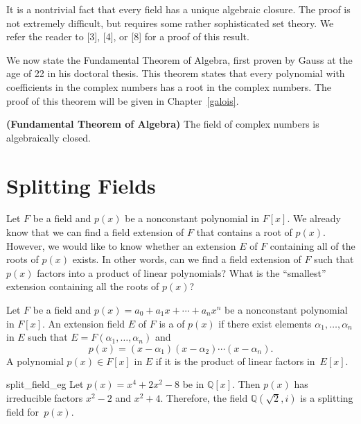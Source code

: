 It is a nontrivial fact that every field has a unique algebraic
closure. The proof is not extremely difficult, but requires some rather
sophisticated set theory. We refer the reader to [3], [4], or [8] for
a proof of this result.   %


We now state the  Fundamental Theorem of Algebra, first proven by
Gauss at the age of 22 in his doctoral thesis. This theorem states
that every polynomial with coefficients in the complex numbers has a
root in the complex numbers.  The proof of this theorem will be given
in Chapter~\ref{galois}.  
 

\begin{theorem} \textbf{(Fundamental Theorem of
Algebra)}
The field of complex numbers is algebraically closed.
\end{theorem}


 
\section{Splitting Fields}


Let $F$ be a field and $p(x)$ be a nonconstant polynomial in $F[x]$.
We already know that we can find a field extension of $F$ that
contains a root of $p(x)$. However, we would like to know whether an
extension $E$ of $F$ containing all of the roots of $p(x)$ exists.
In other words, can we find a field extension of $F$ such that $p(x)$
factors into a product of linear polynomials? What is the ``smallest''
extension containing all the roots of $p(x)$? 

 
Let $F$ be a field and $p(x) = a_0 + a_1 x + \cdots + a_n x^n$ be a
nonconstant polynomial in $F[x]$. An extension field $E$ of $F$ is a
of $p(x)$ if there exist elements $\alpha_1, \ldots, \alpha_n$ in $E$
such that $E = F( \alpha_1, \ldots, \alpha_n )$ and 
\[
p(x) = ( x - \alpha_1 )(x - \alpha_2) \cdots (x - \alpha_n).
\]
A polynomial $p(x) \in F[x]$  in $E$ if it is the
product of linear factors in~$E[x]$.   
 

\begin{example}{split_field_eg}
Let $p(x) = x^4 + 2x^2 - 8$ be in ${\mathbb Q}[x]$. Then $p(x)$ has
irreducible factors $x^2 -2$ and $x^2 + 4$. Therefore, the field
${\mathbb Q}( \sqrt{2}, i )$ is a splitting field for~$p(x)$. 
\end{example}
 

